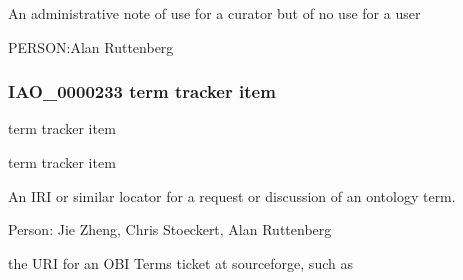 \documentclass[letterpaper,10pt,english]{sphinxmanual}
\begin{document}
\begin{sphinxShadowBox}

\sphinxAtStartPar
An administrative note of use for a curator but of no use for a user
\end{sphinxShadowBox}

\begin{sphinxShadowBox}

\sphinxAtStartPar
PERSON:Alan Ruttenberg
\end{sphinxShadowBox}
\begin{quote}

\ignorespaces \end{quote}


\subsubsection{IAO\_0000233 \sphinxhyphen{} term tracker item}
\label{\detokenize{doc-IAO_0000233:iao-0000233-term-tracker-item}}\label{\detokenize{doc-IAO_0000233:index-0}}\label{\detokenize{doc-IAO_0000233::doc}}
\begin{sphinxShadowBox}

\sphinxAtStartPar
term tracker item
\end{sphinxShadowBox}

\begin{sphinxShadowBox}

\sphinxAtStartPar
term tracker item
\end{sphinxShadowBox}

\begin{sphinxShadowBox}

\sphinxAtStartPar
An IRI or similar locator for a request or discussion of an ontology term.
\end{sphinxShadowBox}

\begin{sphinxShadowBox}

\sphinxAtStartPar
Person: Jie Zheng, Chris Stoeckert, Alan Ruttenberg
\end{sphinxShadowBox}

\begin{sphinxShadowBox}

\sphinxAtStartPar
the URI for an OBI Terms ticket at sourceforge, such as 
\end{sphinxShadowBox}
\end{document}

